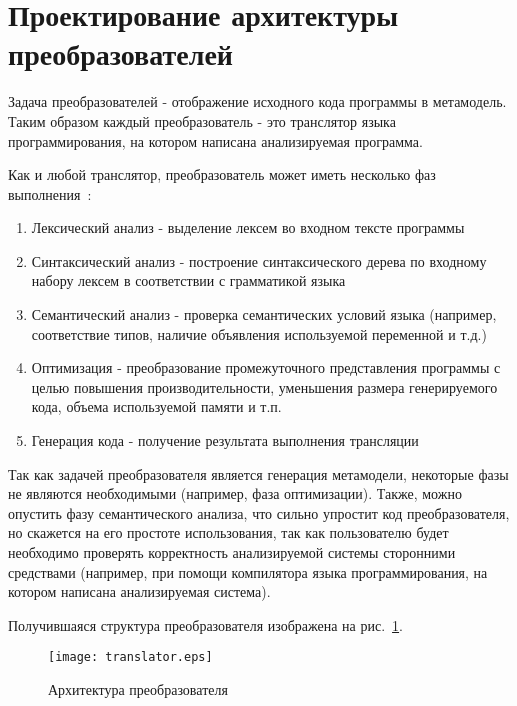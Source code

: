 \section{Проектирование архитектуры преобразователей}

Задача преобразователей - отображение исходного кода программы в метамодель.
Таким образом каждый преобразователь - это транслятор языка программирования, на
котором написана анализируемая программа.

Как и любой транслятор, преобразователь может иметь несколько фаз
выполнения~\cite{Aho1986}:

\begin{enumerate}
    \item Лексический анализ - выделение лексем во входном тексте программы
    \item Синтаксический анализ - построение синтаксического дерева по входному
    набору лексем в соответствии с грамматикой языка
    \item Семантический анализ - проверка семантических условий языка (например,
    соответствие типов, наличие объявления используемой переменной и т.д.)
    \item Оптимизация - преобразование промежуточного представления программы
    с целью повышения производительности, уменьшения размера генерируемого кода,
    объема используемой памяти и т.п.
    \item Генерация кода - получение результата выполнения трансляции
\end{enumerate}

Так как задачей преобразователя является генерация метамодели, некоторые фазы не
являются необходимыми (например, фаза оптимизации). Также, можно опустить фазу
семантического анализа, что сильно упростит код преобразователя, но скажется на
его простоте использования, так как пользователю будет необходимо проверять
корректность анализируемой системы сторонними средствами (например, при помощи
компилятора языка программирования, на котором написана анализируемая система).

Получившаяся структура преобразователя изображена на рис.~\ref{fig:translator}.

\begin{figure}[h]
    \begin{center}
        \texttt{[image: translator.eps]}
    \end{center}
    \caption{Архитектура преобразователя}
    \label{fig:translator}
\end{figure}

